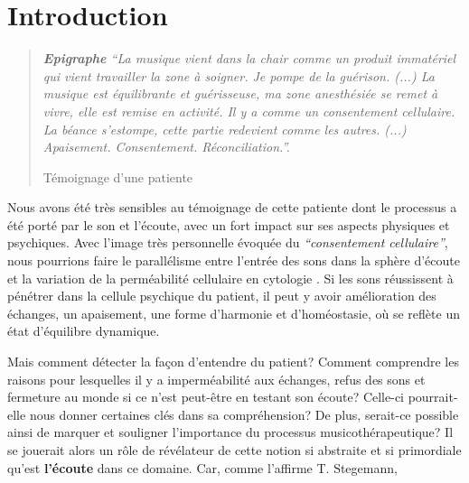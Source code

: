

\chapter{Introduction}



\begin{quotation}
 \textit{\textbf{Epigraphe  }   ``La musique vient dans la chair comme un produit immatériel
 qui vient travailler la zone à soigner. Je pompe de la
 guérison.
 (...)
 La musique est équilibrante et guérisseuse, ma zone
 anesthésiée se remet à vivre, elle est remise en activité.
 Il y a comme un consentement cellulaire.
La béance s'estompe, cette
partie redevient comme les autres. (...)
Apaisement. Consentement. Réconciliation.''.}

Témoignage d'une patiente

\end{quotation}

Nous avons été très sensibles au témoignage de cette patiente dont le
processus a été porté par le son et l'écoute, avec un fort impact
sur ses aspects physiques
et psychiques.
Avec l'image très personnelle évoquée du
\textit{``consentement cellulaire''}, nous pourrions faire le
parallélisme entre l'entrée des sons dans la sphère d'écoute et la variation de la
perméabilité cellulaire en cytologie \autocite[ch. 3 pp. 70--76]{marieb:biologie}. Si les sons réussissent à pénétrer dans la
cellule psychique du patient, il peut y avoir amélioration des
échanges, un apaisement, une forme d'harmonie et d'homéostasie,  \autocite[ch. 1
p. 10]{marieb:biologie} où se reflète un état d'équilibre dynamique.

Mais comment détecter la façon d'entendre du patient?
Comment comprendre les raisons pour lesquelles il y a imperméabilité
aux
échanges, refus des sons et fermeture au monde si ce n'est
peut-être  en testant
son écoute?  Celle-ci pourrait-elle nous donner certaines clés dans sa
compréhension?
De plus, serait-ce possible ainsi
de marquer et souligner l'importance du processus musicothérapeutique?
Il se jouerait alors un
rôle de
révélateur de cette notion si abstraite et si primordiale qu'est
\textbf{l'écoute} dans ce domaine. Car, comme l'affirme T. Stegemann,

